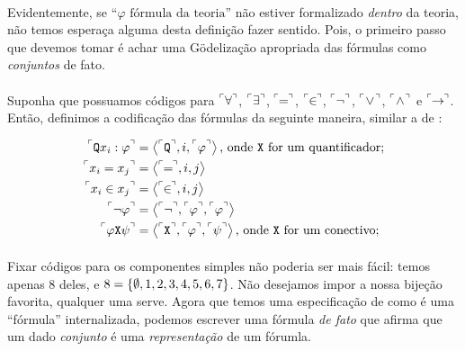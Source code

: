         \paragraph{}
            Evidentemente, se ``$\varphi \text{ fórmula da teoria}$'' não estiver formalizado \textit{dentro} da teoria, não 
            temos esperaça alguma desta definição fazer sentido. Pois, o primeiro passo que devemos tomar é achar uma Gödelização
            apropriada das fórmulas como \textit{conjuntos} de fato. 
        \paragraph{}
            Suponha que possuamos códigos para $\FMLA{\forall}$, $\FMLA{\exists}$, $\FMLA{\!\!=\!\!}$, $\FMLA{\!\!\in\!\!}$, 
            $\FMLA{\neg}$, $\FMLA{\!\lor\!}$, $\FMLA{\!\land\!}$ e $\FMLA{\!\!\rar\!\!}$.
            Então, definimos a codificação das fórmulas da seguinte maneira, similar a de \cite{Drake}:

        \begin{align*}
            \FMLA{\texttt{Q} x_i:\varphi} &= \TUPLE{\FMLA{\texttt{Q}}}{i}{\FMLA{\varphi}}           \text{, onde \texttt{X} for um quantificador;}  \\
            \FMLA{x_i  = x_j}             &= \TUPLE{\FMLA{\!\!=\!\!}}{i}{j}                                                                         \\
            \FMLA{x_i\in x_j}             &= \TUPLE{\FMLA{\!\!\in\!\!}}{i}{j}                                                                       \\
            \FMLA{\neg\varphi}            &= \TUPLE{\FMLA{\neg}}{\FMLA{\varphi}}{\FMLA{\varphi}}                                                    \\
            \FMLA{\varphi\texttt{X}\psi}  &= \TUPLE{\FMLA{\texttt{X}}}{\FMLA{\varphi}}{\FMLA{\psi}} \text{, onde \texttt{X} for um conectivo;}      
        \end{align*}

        \paragraph{}
            Fixar códigos para os componentes simples não poderia ser mais fácil: temos apenas 8 deles, e $8 = \SET{\emptyset}{1}{2}{3}{4}{5}{6}{7}$.
            Não desejamos impor a nossa bijeção favorita, qualquer uma serve. Agora que temos uma especificação de como é uma ``fórmula'' internalizada, 
            podemos escrever uma fórmula \textit{de fato} que afirma que um dado \textit{conjunto} é uma \textit{representação} de um fórumla.
            
